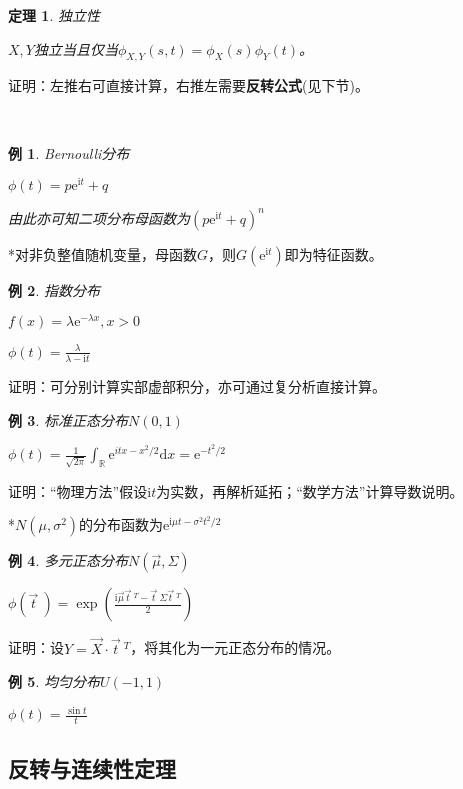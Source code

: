 \documentclass[a4paper,UTF8,fontset=windows]{ctexart}
\newtheorem{thm}{定理}[section]
\newtheorem{exmp}{例}[section]
\begin{document}
\begin{thm} 独立性

$X,Y$独立当且仅当$\phi_{X,Y}(s,t)=\phi_X(s)\phi_Y(t)$。
\end{thm}

证明：左推右可直接计算，右推左需要\textbf{反转公式}(见下节)。

~

\begin{exmp} Bernoulli分布

$\phi(t)=p\mathrm{e}^{\mathrm{i}t}+q$

由此亦可知二项分布母函数为$(p\mathrm{e}^{\mathrm{i}t}+q)^n$
\end{exmp}

*对非负整值随机变量，母函数$G$，则$G(\mathrm{e}^{\mathrm{i}t})$即为特征函数。

\begin{exmp} 指数分布

$f(x)=\lambda\mathrm{e}^{-\lambda x},x>0$

$\phi(t)=\frac{\lambda}{\lambda-\mathrm{i}t}$
\end{exmp}

证明：可分别计算实部虚部积分，亦可通过复分析直接计算。

\begin{exmp} 标准正态分布$N(0,1)$

$\phi(t)=\frac{1}{\sqrt{2\pi}}\int_\mathbb{R}\mathrm{e}^{itx-x^2/2}\mathrm{d}x=\mathrm{e}^{-t^2/2}$
\end{exmp}

证明：“物理方法”假设$\mathrm{i}t$为实数，再解析延拓；“数学方法”计算导数说明。

*$N(\mu,\sigma^2)$的分布函数为$\mathrm{e}^{\mathrm{i}\mu t-\sigma^2t^2/2}$

\begin{exmp} 多元正态分布$N(\vec{\mu},\Sigma)$

$\phi(\vec{t}\ )=\exp\left(\frac{\mathrm{i}\vec{\mu}\vec{t}\ ^T-\vec{t}\ \Sigma\vec{t}\ ^T}{2}\right)$
\end{exmp}

证明：设$Y=\vec{X}\cdot\vec{t}\ ^T$，将其化为一元正态分布的情况。

\begin{exmp} 均匀分布$U(-1,1)$

$\phi(t)=\frac{\sin{t}}{t}$
\end{exmp}

\subsection{反转与连续性定理}
\end{document}

